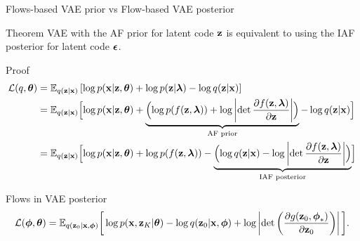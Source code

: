 \begin{frame}{Flows-based VAE prior vs Flow-based VAE posterior}
	\begin{block}{Theorem}
	VAE with the AF prior for latent code $\mathbf{z}$ is equivalent to using the IAF posterior for latent code $\boldsymbol{\epsilon}$.
	\end{block}
	\begin{block}{Proof}
	\vspace{-0.5cm}
	{\footnotesize
	\begin{align*}
	\mathcal{L}(q, \boldsymbol{\theta}) &= \mathbb{E}_{q(\mathbf{z} | \mathbf{x})} \left[ \log p(\mathbf{x} | \mathbf{z}, \boldsymbol{\theta}) +  \log p(\mathbf{z} | \boldsymbol{\lambda}) - \log q(\mathbf{z} | \mathbf{x}) \right] \\
	&= \mathbb{E}_{q(\mathbf{z} | \mathbf{x})} \Bigl[ \log p(\mathbf{x} | \mathbf{z}, \boldsymbol{\theta}) + \underbrace{ \Bigl( \log p(f(\mathbf{z}, \boldsymbol{\lambda})) + \log \left| \det \frac{\partial f(\mathbf{z}, \boldsymbol{\lambda})}{\partial \mathbf{z}} \right| \Bigr) }_{\text{AF prior}} - \log q(\mathbf{z} | \mathbf{x}) \Bigr] \\
	&= \mathbb{E}_{q(\mathbf{z} | \mathbf{x})} \Bigl[ \log p(\mathbf{x} | \mathbf{z}, \boldsymbol{\theta}) +  \log p(f(\mathbf{z}, \boldsymbol{\lambda})) - \underbrace{ \Bigl( \log q(\mathbf{z} | \mathbf{x}) - \log \left| \det \frac{\partial f(\mathbf{z}, \boldsymbol{\lambda})}{\partial \mathbf{z}} \right| \Bigr) }_{\text{IAF posterior}} \Bigr]
	\end{align*}
	}
	\end{block}
	\vspace{-0.5cm}
	\begin{block}{Flows in VAE posterior}
		\vspace{-0.3cm}
		{\footnotesize
		\[
			\mathcal{L} (\boldsymbol{\phi}, \boldsymbol{\theta}) 
			= \mathbb{E}_{q(\mathbf{z}_0 | \mathbf{x}, \boldsymbol{\phi})} \bigg[\log p(\mathbf{x}, \mathbf{z}_K | \boldsymbol{\theta}) -  \log q(\mathbf{z}_0 | \mathbf{x}, \boldsymbol{\phi} ) +   \log \left| \det \left( \frac{\partial g(\mathbf{z}_0, \boldsymbol{\phi}_*)}{\partial \mathbf{z}_0} \right) \right| \bigg].
		\]
		}
	\end{block}
\end{frame}

